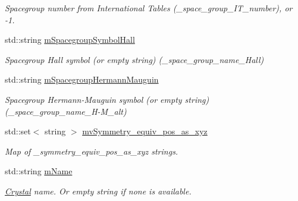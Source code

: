 \begin{DoxyCompactItemize}
\begin{DoxyCompactList}\small\item\em Spacegroup number from International Tables (\+\_\+space\+\_\+group\+\_\+\+I\+T\+\_\+number), or -\/1. \end{DoxyCompactList}\item 
\mbox{\label{class_obj_cryst_1_1_c_i_f_data_aa7e1eb93e694dc809a925e2abfb50700}} 
std\+::string \mbox{\hyperlink{class_obj_cryst_1_1_c_i_f_data_aa7e1eb93e694dc809a925e2abfb50700}{m\+Spacegroup\+Symbol\+Hall}}
\begin{DoxyCompactList}\small\item\em Spacegroup Hall symbol (or empty string) (\+\_\+space\+\_\+group\+\_\+name\+\_\+\+Hall) \end{DoxyCompactList}\item 
\mbox{\label{class_obj_cryst_1_1_c_i_f_data_aa76770c71d42d48e8d6a83468acd341b}} 
std\+::string \mbox{\hyperlink{class_obj_cryst_1_1_c_i_f_data_aa76770c71d42d48e8d6a83468acd341b}{m\+Spacegroup\+Hermann\+Mauguin}}
\begin{DoxyCompactList}\small\item\em Spacegroup Hermann-\/\+Mauguin symbol (or empty string) (\+\_\+space\+\_\+group\+\_\+name\+\_\+\+H-\/\+M\+\_\+alt) \end{DoxyCompactList}\item 
\mbox{\label{class_obj_cryst_1_1_c_i_f_data_a2946588a8b6408e51393ac42f7a84193}} 
std\+::set$<$ string $>$ \mbox{\hyperlink{class_obj_cryst_1_1_c_i_f_data_a2946588a8b6408e51393ac42f7a84193}{mv\+Symmetry\+\_\+equiv\+\_\+pos\+\_\+as\+\_\+xyz}}
\begin{DoxyCompactList}\small\item\em Map of \+\_\+symmetry\+\_\+equiv\+\_\+pos\+\_\+as\+\_\+xyz strings. \end{DoxyCompactList}\item 
\mbox{\label{class_obj_cryst_1_1_c_i_f_data_a89e040b33c74bb6f95a5e5f34ff04117}} 
std\+::string \mbox{\hyperlink{class_obj_cryst_1_1_c_i_f_data_a89e040b33c74bb6f95a5e5f34ff04117}{m\+Name}}
\begin{DoxyCompactList}\small\item\em \mbox{\hyperlink{class_obj_cryst_1_1_crystal}{Crystal}} name. Or empty string if none is available. \end{DoxyCompactList}\item 

\end{DoxyCompactItemize}
